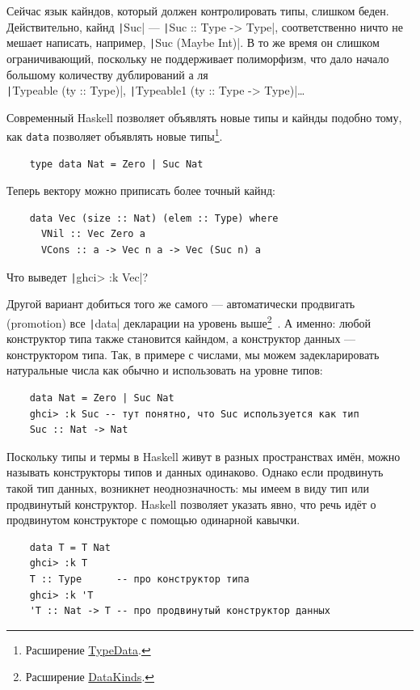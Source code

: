 Сейчас язык кайндов, который должен контролировать типы, слишком беден.
Действительно, кайнд \texttt|Suc| --- \texttt|Suc :: Type -> Type|, соответственно ничто не мешает написать, например, \texttt|Suc (Maybe Int)|.
В то же время он слишком ограничивающий, поскольку не поддерживает полиморфизм, что дало начало большому количеству дублирований а ля \\ \texttt|Typeable (ty :: Type)|, \texttt|Typeable1 (ty :: Type -> Type)|\ldots

Современный Haskell позволяет объявлять новые типы и кайнды подобно тому, как \texttt{data} позволяет объявлять новые типы\footnote{Расширение \href{https://downloads.haskell.org/ghc/latest/docs/users_guide/exts/type_data.html\#extension-TypeData}{TypeData}.}.
\begin{verbatim}
    type data Nat = Zero | Suc Nat
\end{verbatim}

Теперь вектору можно приписать более точный кайнд:
\begin{verbatim}
    data Vec (size :: Nat) (elem :: Type) where
      VNil :: Vec Zero a
      VCons :: a -> Vec n a -> Vec (Suc n) a
\end{verbatim}

\begin{task}
    Что выведет \texttt|ghci> :k Vec|?
\end{task}

Другой вариант добиться того же самого --- автоматически продвигать (promotion) все \texttt|data| декларации на уровень выше\footnote{Расширение \href{https://downloads.haskell.org/ghc/latest/docs/users_guide/exts/data_kinds.html\#extension-DataKinds}{DataKinds}.}~\cite{yorgey2012giving}.
А именно: любой конструктор типа также становится кайндом, а конструктор данных --- конструктором типа.
Так, в примере с числами, мы можем задекларировать натуральные числа как обычно и использовать на уровне типов:
\begin{verbatim}
    data Nat = Zero | Suc Nat
    ghci> :k Suc -- тут понятно, что Suc используется как тип
    Suc :: Nat -> Nat
\end{verbatim}

Поскольку типы и термы в Haskell живут в разных пространствах имён, можно называть конструкторы типов и данных одинаково.
Однако если продвинуть такой тип данных, возникнет неоднозначность: мы имеем в виду тип или продвинутый конструктор.
Haskell позволяет указать явно, что речь идёт о продвинутом конструкторе с помощью одинарной кавычки.
\begin{verbatim}
    data T = T Nat
    ghci> :k T
    T :: Type      -- про конструктор типа
    ghci> :k 'T
    'T :: Nat -> T -- про продвинутый конструктор данных
\end{verbatim}


